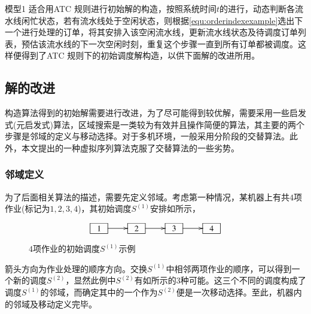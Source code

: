 模型1 适合用ATC 规则进行初始解的构造，按照系统时间$t$的进行，动态判断各流水线闲忙状态，若有流水线处于空闲状态，则根据\eqref{equ:orderindexexample}选出下一个进行处理的订单，将其安排入该空闲流水线，更新流水线状态及待调度订单列表，预估该流水线的下一次空闲时刻，重复这个步骤一直到所有订单都被调度。这样便得到了ATC 规则下的初始调度解构造，以供下面解的改进所用。
%

\subsection{解的改进}
构造算法得到的初始解需要进行改进，为了尽可能得到较优解，需要采用一些启发式(元启发式)算法，区域搜索是一类较为有效并且操作简便的算法，其主要的两个步骤是邻域的定义与移动选择。对于多机环境，一般采用分阶段的交替算法。此外，本文提出的一种虚拟序列算法克服了交替算法的一些劣势。

\subsubsection{邻域定义}
为了后面相关算法的描述，需要先定义邻域。考虑第一种情况，某机器上有共$4$项作业(标记为$1,2,3,4$)，其初始调度$S^{(1)}$安排如所示，
\begin{figure}[h]
\begin{equation*}
\xymatrix{
\jobunit{1} \ar[r] & \jobunit{2} \ar[r] &\jobunit{3} \ar[r] &\jobunit{4}
}
\end{equation*}
\caption{$4$项作业的初始调度$S^{(1)}$示例\label{fig:4example}}
\end{figure}
箭头方向为作业处理的顺序方向。交换$S^{(1)}$中相邻两项作业的顺序，可以得到一个新的调度$S^{(2)}$，显然此例中$S^{(2)}$有如所示的$3$种可能。这三个不同的调度构成了调度$S^{(1)}$的邻域，而确定其中的一个作为$S^{(2)}$便是一次移动选择。至此，机器内的邻域及移动定义完毕。

